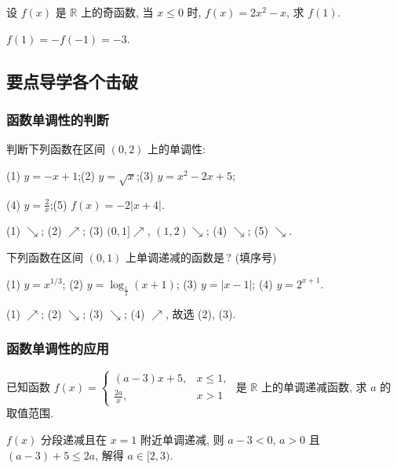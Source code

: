   \begin{exercise}
    设 $f(x)$ 是 $\mathbb{R}$ 上的奇函数, 当 $x\leqslant 0$ 时, $f(x)=2x^2-x$, 求 $f(1)$.
  \end{exercise}

  \beginsolution
    $f(1)=-f(-1)=-3$.
  \endsolution
  
  \subsection{要点导学\quad 各个击破}
  \subsubsection{函数单调性的判断}
  \begin{example}
    判断下列函数在区间 $(0,2)$ 上的单调性:
    
    (1) $y=-x+1$;\qquad (2) $y=\sqrt{x}$;\qquad  (3) $y=x^2-2x+5$;
    
    (4) $y=\frac2x$;\qquad (5) $f(x)=-2|x+4|$.
  \end{example}

  \beginsolution
    (1) $\searrow$; (2) $\nearrow$; (3) $(0,1]\nearrow$, $(1,2)\searrow$; (4) $\searrow$; (5) $\searrow$.
  \endsolution
  
  \lianxi
  \begin{exercise}[s]
    下列函数在区间 $(0,1)$ 上单调递减的函数是\,? (填序号)
    
    (1) $y= x^{1/3}$; (2) $y=\log_{\frac12}(x+1)$; 
    (3) $y=|x-1|$; (4) $y=2^{x+1}$.
  \end{exercise}
  
  \beginsolution
    (1) $\nearrow$; (2) $\searrow$; (3) $\searrow$; (4) $\nearrow$, 故选 (2), (3).
  \endsolution
  
  \subsubsection{函数单调性的应用}
  \begin{example}
    已知函数 $f(x)=\begin{cases}
      (a-3)x+5, & x\leqslant 1,\\
      \frac{2a}x, & x>1 \end{cases}$ 
    是 $\mathbb{R}$ 上的单调递减函数, 求 $a$ 的取值范围.
  \end{example}

  \beginsolution
    $f(x)$ 分段递减且在 $x=1$ 附近单调递减, 则 $a-3<0$, $a>0$ 且 $(a-3)+5\leqslant 2a$, 解得 $a\in[2,3)$.
    
